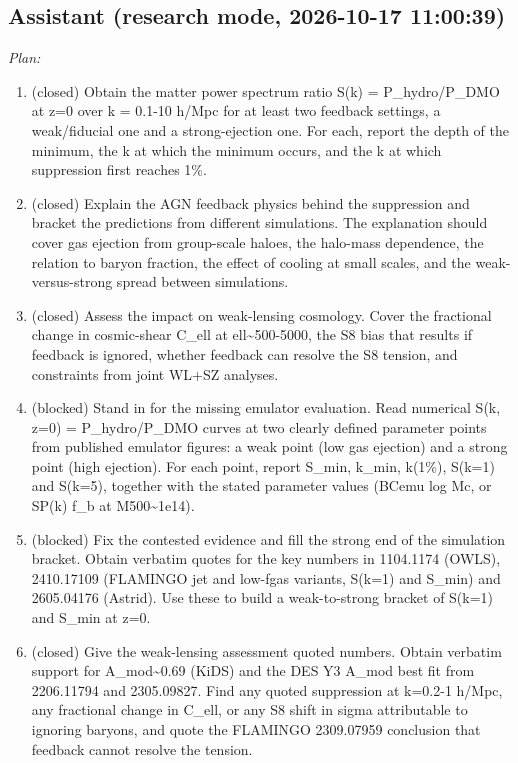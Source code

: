 \documentclass[11pt,a4paper]{article}
\begin{document}
\subsection*{Assistant \small(research mode, 2026-10-17 11:00:39)}
\textit{Plan:}\begin{enumerate}
  \item (closed) Obtain the matter power spectrum ratio S(k) = P\_hydro/P\_DMO at z=0 over k = 0.1-10 h/Mpc for at least two feedback settings, a weak/fiducial one and a strong-ejection one. For each, report the depth of the minimum, the k at which the minimum occurs, and the k at which suppression first reaches 1\%.
  \item (closed) Explain the AGN feedback physics behind the suppression and bracket the predictions from different simulations. The explanation should cover gas ejection from group-scale haloes, the halo-mass dependence, the relation to baryon fraction, the effect of cooling at small scales, and the weak-versus-strong spread between simulations.
  \item (closed) Assess the impact on weak-lensing cosmology. Cover the fractional change in cosmic-shear C\_ell at ell\textasciitilde{}500-5000, the S8 bias that results if feedback is ignored, whether feedback can resolve the S8 tension, and constraints from joint WL+SZ analyses.
  \item (blocked) Stand in for the missing emulator evaluation. Read numerical S(k, z=0) = P\_hydro/P\_DMO curves at two clearly defined parameter points from published emulator figures: a weak point (low gas ejection) and a strong point (high ejection). For each point, report S\_min, k\_min, k(1\%), S(k=1) and S(k=5), together with the stated parameter values (BCemu log Mc, or SP(k) f\_b at M500\textasciitilde{}1e14).
  \item (blocked) Fix the contested evidence and fill the strong end of the simulation bracket. Obtain verbatim quotes for the key numbers in 1104.1174 (OWLS), 2410.17109 (FLAMINGO jet and low-fgas variants, S(k=1) and S\_min) and 2605.04176 (Astrid). Use these to build a weak-to-strong bracket of S(k=1) and S\_min at z=0.
  \item (closed) Give the weak-lensing assessment quoted numbers. Obtain verbatim support for A\_mod\textasciitilde{}0.69 (KiDS) and the DES Y3 A\_mod best fit from 2206.11794 and 2305.09827. Find any quoted suppression at k=0.2-1 h/Mpc, any fractional change in C\_ell, or any S8 shift in sigma attributable to ignoring baryons, and quote the FLAMINGO 2309.07959 conclusion that feedback cannot resolve the tension.
\end{enumerate}
\end{document}
